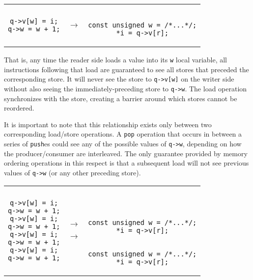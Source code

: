 \begin{center}
    \begin{tabular}{ccc}
        \begin{lstlisting}[style=c,showlines=true]
q->v[w] = i;
q->w = w + 1;

        \end{lstlisting}
        & \parbox[c]{2em}{
            \vspace{0.5\baselineskip}
            $\longrightarrow$
        } &
        \begin{lstlisting}[style=c]

const unsigned w = /*...*/;
*i = q->v[r];
        \end{lstlisting} \\[1.25em]
    \end{tabular}
\end{center}

That is, any time the reader side loads a value into its \texttt{w} local
variable, all instructions following that load are guaranteed to see all stores
that preceded the corresponding store.  It will never see the store to
\texttt{q->v[w]} on the writer side without also seeing the
immediately-preceding store to \texttt{q->w}.  The load operation synchronizes
with the store, creating a barrier around which stores cannot be reordered.

It is important to note that this relationship exists only between two
corresponding load/store operations.  A \texttt{pop} operation that occurs in
between a series of \texttt{push}es could see any of the possible values of
\texttt{q->w}, depending on how the producer/consumer are interleaved.  The only
guarantee provided by memory ordering operations in this respect is that a
subsequent load will not see previous values of \texttt{q->w} (or any other
preceding store).

\begin{center}
    \begin{tabular}{ccc}
        \begin{lstlisting}[style=c,showlines=true]
q->v[w] = i;
q->w = w + 1;
q->v[w] = i;
q->w = w + 1;
q->v[w] = i;
q->w = w + 1;
q->v[w] = i;
q->w = w + 1;

        \end{lstlisting}
        & \parbox[c]{2em}{
            \vspace{2\baselineskip}
            $\longrightarrow$

            \vspace{2.25\baselineskip}
            $\longrightarrow$
        } &
        \begin{lstlisting}[style=c,showlines=true]



const unsigned w = /*...*/;
*i = q->v[r];


const unsigned w = /*...*/;
*i = q->v[r];
        \end{lstlisting} \\[1.5em]
    \end{tabular}
\end{center}

